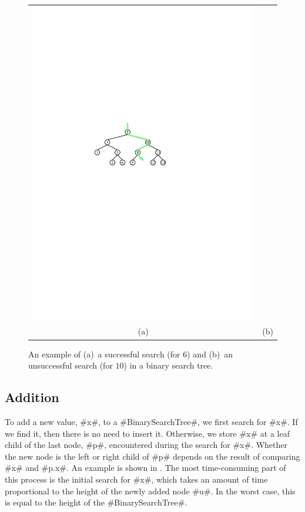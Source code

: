 \begin{figure}
\begin{center}
\begin{tabular}{cc}
    \includegraphics[width=\HalfScaleIfNeeded]{figs/bst-example-3} \\
    (a) & (b)
    \end{tabular}
  \end{center}
  \caption{An example of (a)~a successful search (for $6$) and (b)~an unsuccessful search (for $10$) in a binary search tree.}
\end{figure}


\subsection{Addition}

To add a new value, #x#, to a #BinarySearchTree#, we first search for
#x#. If we find it, then there is no need to insert it.  Otherwise,
we store #x# at a leaf child of the last node, #p#, encountered during the
search for #x#. Whether the new node is the left or right child of #p# depends on the result of comparing #x# and #p.x#.
An example is shown in . The most time-consuming
part of this process is the initial search for #x#, which takes an
amount of time proportional to the height of the newly added node #u#.
In the worst case, this is equal to the height of the #BinarySearchTree#.


